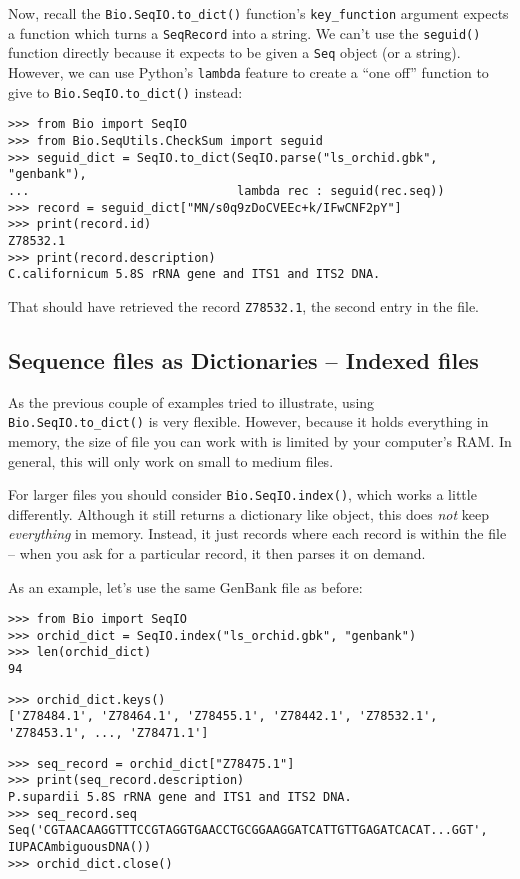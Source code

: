 \documentclass{report}
\begin{document}
Now, recall the \verb|Bio.SeqIO.to_dict()| function's \verb|key_function| argument expects a function which turns a \verb|SeqRecord| into a string.  We can't use the \verb|seguid()| function directly because it expects to be given a \verb|Seq| object (or a string).  However, we can use Python's \verb|lambda| feature to create a ``one off'' function to give to \verb|Bio.SeqIO.to_dict()| instead:

\begin{verbatim}
>>> from Bio import SeqIO
>>> from Bio.SeqUtils.CheckSum import seguid
>>> seguid_dict = SeqIO.to_dict(SeqIO.parse("ls_orchid.gbk", "genbank"),
...                             lambda rec : seguid(rec.seq))
>>> record = seguid_dict["MN/s0q9zDoCVEEc+k/IFwCNF2pY"]
>>> print(record.id)
Z78532.1
>>> print(record.description)
C.californicum 5.8S rRNA gene and ITS1 and ITS2 DNA.
\end{verbatim}

\noindent That should have retrieved the record {\tt Z78532.1}, the second entry in the file.

\subsection{Sequence files as Dictionaries -- Indexed files}
\label{sec:SeqIO-index}

As the previous couple of examples tried to illustrate, using
\verb|Bio.SeqIO.to_dict()| is very flexible. However, because it holds
everything in memory, the size of file you can work with is limited by your
computer's RAM. In general, this will only work on small to medium files.

For larger files you should consider
\verb|Bio.SeqIO.index()|, which works a little differently. Although
it still returns a dictionary like object, this does \emph{not} keep
\emph{everything} in memory. Instead, it just records where each record
is within the file -- when you ask for a particular record, it then parses
it on demand.

As an example, let's use the same GenBank file as before:

\begin{verbatim}
>>> from Bio import SeqIO
>>> orchid_dict = SeqIO.index("ls_orchid.gbk", "genbank")
>>> len(orchid_dict)
94
\end{verbatim}
\begin{verbatim}
>>> orchid_dict.keys()
['Z78484.1', 'Z78464.1', 'Z78455.1', 'Z78442.1', 'Z78532.1', 'Z78453.1', ..., 'Z78471.1']
\end{verbatim}
\begin{verbatim}
>>> seq_record = orchid_dict["Z78475.1"]
>>> print(seq_record.description)
P.supardii 5.8S rRNA gene and ITS1 and ITS2 DNA.
>>> seq_record.seq
Seq('CGTAACAAGGTTTCCGTAGGTGAACCTGCGGAAGGATCATTGTTGAGATCACAT...GGT', IUPACAmbiguousDNA())
>>> orchid_dict.close()
\end{verbatim}
\end{document}

